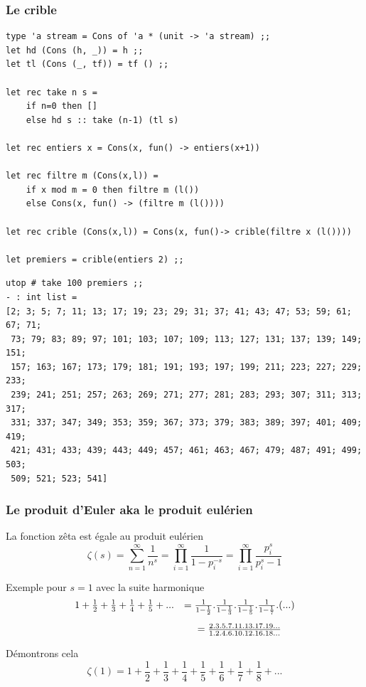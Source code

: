 \subsubsection{Le crible}
\begin{Verbatim}
type 'a stream = Cons of 'a * (unit -> 'a stream) ;;
let hd (Cons (h, _)) = h ;;
let tl (Cons (_, tf)) = tf () ;;

let rec take n s =
	if n=0 then []
	else hd s :: take (n-1) (tl s) 

let rec entiers x = Cons(x, fun() -> entiers(x+1)) 

let rec filtre m (Cons(x,l)) =
	if x mod m = 0 then filtre m (l()) 
	else Cons(x, fun() -> (filtre m (l()))) 

let rec crible (Cons(x,l)) = Cons(x, fun()-> crible(filtre x (l())))

let premiers = crible(entiers 2) ;;
\end{Verbatim}
\begin{Verbatim}
utop # take 100 premiers ;;
- : int list =
[2; 3; 5; 7; 11; 13; 17; 19; 23; 29; 31; 37; 41; 43; 47; 53; 59; 61; 67; 71;
 73; 79; 83; 89; 97; 101; 103; 107; 109; 113; 127; 131; 137; 139; 149; 151;
 157; 163; 167; 173; 179; 181; 191; 193; 197; 199; 211; 223; 227; 229; 233;
 239; 241; 251; 257; 263; 269; 271; 277; 281; 283; 293; 307; 311; 313; 317;
 331; 337; 347; 349; 353; 359; 367; 373; 379; 383; 389; 397; 401; 409; 419;
 421; 431; 433; 439; 443; 449; 457; 461; 463; 467; 479; 487; 491; 499; 503;
 509; 521; 523; 541]
\end{Verbatim}

\subsubsection{Le produit d'Euler aka le produit eulérien}
La fonction zêta est égale au produit eulérien
\[ \zeta(s) = \sum_{n=1}^{\infty} \frac{1}{n^s} = \prod_{i=1}^\infty \frac{1}{1-p_i^{-s}} = \prod_{i=1}^\infty \frac{p_i^s}{p_i^s-1} \]

Exemple pour $s=1$ avec la suite harmonique
$$
\begin{array}{ccc}
1+ \frac{1}{2} + \frac{1}{3} + \frac{1}{4} + \frac{1}{5} +...  &=  \frac{1}{1-\frac{1}{2}} .\frac{1}{1-\frac{1}{3}}.\frac{1}{1-\frac{1}{5}}.\frac{1}{1-\frac{1}{7}}. (...) \\[\bigskipamount]
&= \frac{2.3.5.7.11.13.17.19...}{1.2.4.6.10.12.16.18...} 
\end{array}
$$

Démontrons cela
\[\zeta(1) = 1+ \frac{1}{2} + \frac{1}{3} + \frac{1}{4} + \frac{1}{5}+ \frac{1}{6}+ \frac{1}{7} +  \frac{1}{8} +... \]


